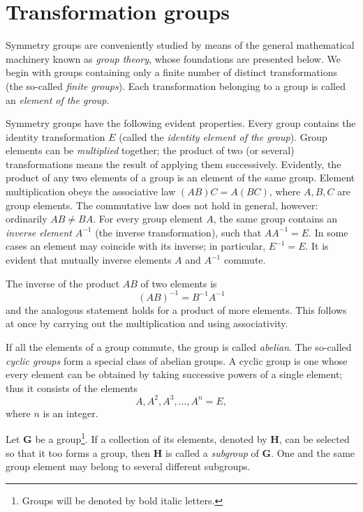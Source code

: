 \section{Transformation groups}



Symmetry groups are conveniently studied by means of the general mathematical machinery known as \emph{group theory}, whose foundations are presented below. We begin with groups containing only a finite number of distinct transformations (the so-called \emph{finite groups}). Each transformation belonging to a group is called an \emph{element of the group}.

Symmetry groups have the following evident properties. Every group contains the identity transformation $E$ (called the \emph{identity element of the group}). Group elements can be \emph{multiplied} together; the product of two (or several) transformations means the result of applying them successively. Evidently, the product of any two elements of a group is an element of the same group. Element multiplication obeys the associative law $(AB)C=A(BC)$, where $A,B,C$ are group elements. The commutative law does not hold in general, however: ordinarily $AB\ne BA$. For every group element $A$, the same group contains an \emph{inverse element} $A^{-1}$ (the inverse transformation), such that $AA^{-1}=E$. In some
cases an element may coincide with its inverse; in particular, $E^{-1}=E$. It is evident that mutually inverse elements $A$ and $A^{-1}$ commute.

The inverse of the product $AB$ of two elements is
\[
(AB)^{-1}=B^{-1}A^{-1}
\]
and the analogous statement holds for a product of more elements. This follows at once by carrying out the multiplication and using associativity.

If all the elements of a group commute, the group is called \emph{abelian}. The so-called \emph{cyclic groups} form a special class of abelian groups. A cyclic group is one whose every element can be obtained by taking successive powers of a single element; thus it consists of the elements
\[
A,A^2,A^3,\ldots,A^n=E,
\]
where $n$ is an integer.

Let $\boldsymbol{G}$ be a group\footnote{Groups will be denoted by bold italic letters.}. If a collection of its elements, denoted by $\boldsymbol{H}$, can be selected so that it too forms a group, then $\boldsymbol{H}$ is called a \emph{subgroup} of $\boldsymbol{G}$. One and the same group element may belong to several different subgroups.

